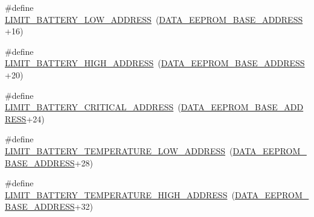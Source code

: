 \begin{DoxyCompactItemize}
\item 
\#define \hyperlink{group__eps__non__volatile__mem__handling_gacd2dba2111e3f62ad937b3fafb7bddec}{L\-I\-M\-I\-T\-\_\-\-B\-A\-T\-T\-E\-R\-Y\-\_\-\-L\-O\-W\-\_\-\-A\-D\-D\-R\-E\-S\-S}~(\hyperlink{group__eps__non__volatile__mem__handling_gaae76a8f2af728d5113e2cee5f525642c}{D\-A\-T\-A\-\_\-\-E\-E\-P\-R\-O\-M\-\_\-\-B\-A\-S\-E\-\_\-\-A\-D\-D\-R\-E\-S\-S}+16)
\item 
\#define \hyperlink{group__eps__non__volatile__mem__handling_gac2e4df80f785e757670a5dbbd30e0442}{L\-I\-M\-I\-T\-\_\-\-B\-A\-T\-T\-E\-R\-Y\-\_\-\-H\-I\-G\-H\-\_\-\-A\-D\-D\-R\-E\-S\-S}~(\hyperlink{group__eps__non__volatile__mem__handling_gaae76a8f2af728d5113e2cee5f525642c}{D\-A\-T\-A\-\_\-\-E\-E\-P\-R\-O\-M\-\_\-\-B\-A\-S\-E\-\_\-\-A\-D\-D\-R\-E\-S\-S}+20)
\item 
\#define \hyperlink{group__eps__non__volatile__mem__handling_ga8603fb14223dab2e51bfa3503380a119}{L\-I\-M\-I\-T\-\_\-\-B\-A\-T\-T\-E\-R\-Y\-\_\-\-C\-R\-I\-T\-I\-C\-A\-L\-\_\-\-A\-D\-D\-R\-E\-S\-S}~(\hyperlink{group__eps__non__volatile__mem__handling_gaae76a8f2af728d5113e2cee5f525642c}{D\-A\-T\-A\-\_\-\-E\-E\-P\-R\-O\-M\-\_\-\-B\-A\-S\-E\-\_\-\-A\-D\-D\-R\-E\-S\-S}+24)
\item 
\#define \hyperlink{group__eps__non__volatile__mem__handling_ga0e947ce5e1d5df7ceb7e080fc2957c0d}{L\-I\-M\-I\-T\-\_\-\-B\-A\-T\-T\-E\-R\-Y\-\_\-\-T\-E\-M\-P\-E\-R\-A\-T\-U\-R\-E\-\_\-\-L\-O\-W\-\_\-\-A\-D\-D\-R\-E\-S\-S}~(\hyperlink{group__eps__non__volatile__mem__handling_gaae76a8f2af728d5113e2cee5f525642c}{D\-A\-T\-A\-\_\-\-E\-E\-P\-R\-O\-M\-\_\-\-B\-A\-S\-E\-\_\-\-A\-D\-D\-R\-E\-S\-S}+28)
\item 
\#define \hyperlink{group__eps__non__volatile__mem__handling_gaaca9832b12c6154b2c0d37972b0c3982}{L\-I\-M\-I\-T\-\_\-\-B\-A\-T\-T\-E\-R\-Y\-\_\-\-T\-E\-M\-P\-E\-R\-A\-T\-U\-R\-E\-\_\-\-H\-I\-G\-H\-\_\-\-A\-D\-D\-R\-E\-S\-S}~(\hyperlink{group__eps__non__volatile__mem__handling_gaae76a8f2af728d5113e2cee5f525642c}{D\-A\-T\-A\-\_\-\-E\-E\-P\-R\-O\-M\-\_\-\-B\-A\-S\-E\-\_\-\-A\-D\-D\-R\-E\-S\-S}+32)
\end{DoxyCompactItemize}
